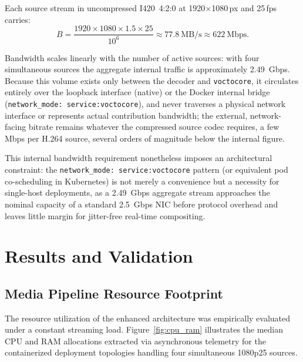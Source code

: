 \documentclass[electronics,article,submit,pdftex,moreauthors]{Definitions/mdpi}
\begin{document}
Each source stream in uncompressed I420~4:2:0 at 1920$\times$1080\,px and 25\,fps
carries:
\[
  B = \frac{1920 \times 1080 \times 1.5 \times 25}{10^6}
    \approx 77.8\ \text{MB/s} \approx 622\ \text{Mbps}.
\]

Bandwidth scales linearly with the number of active sources: with four
simultaneous sources the aggregate internal traffic is approximately
2.49~Gbps.
Because this volume exists only between the decoder and \texttt{voctocore}, it
circulates entirely over the loopback interface (native) or the Docker
internal bridge (\texttt{network\_mode:~service:voctocore}), and never
traverses a physical network interface or represents actual contribution
bandwidth; the external, network-facing bitrate remains whatever the
compressed source codec requires, a few Mbps per H.264 source, several
orders of magnitude below the internal figure.

This internal bandwidth requirement nonetheless imposes an architectural
constraint: the \texttt{network\_mode:~service:voctocore} pattern (or
equivalent pod co-scheduling in Kubernetes) is not merely a convenience but a
necessity for single-host deployments, as a 2.49~Gbps aggregate stream
approaches the nominal capacity of a standard 2.5~Gbps NIC before protocol
overhead and leaves little margin for jitter-free real-time compositing.

\section{Results and Validation}
\label{sec:results}

\subsection{Media Pipeline Resource Footprint}

The resource utilization of the enhanced architecture was empirically evaluated under a constant streaming load. Figure~\ref{fig:cpu_ram} illustrates the median CPU and RAM allocations extracted via asynchronous telemetry for the containerized deployment topologies handling four simultaneous 1080p25 sources.
\end{document}
